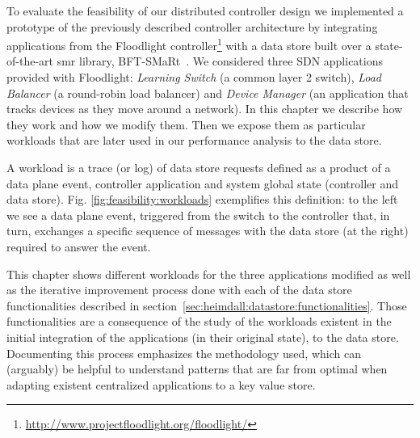 \label{sec:feasibility:apps}
\glsresetall


To evaluate the feasibility of our distributed controller design we implemented a prototype of the previously described controller architecture by integrating applications from the Floodlight controller\footnote{\url{http://www.projectfloodlight.org/floodlight/}} with a data store built over a state-of-the-art \gls{smr} library, BFT-SMaRt~\cite{smart-tr}.
We considered three SDN applications provided with Floodlight: \emph{Learning Switch}  (a common layer 2 switch), \emph{Load   Balancer} (a round-robin load balancer) and \emph{Device Manager} (an application that tracks devices as they move around a network).
In this chapter we describe how they work and how we modify them.  Then we expose them as particular workloads that are later used in our performance analysis to the data store. 



A workload is a trace (or log) of data store requests  defined as a product of a data plane event, controller application and system global state (controller and data store).
Fig. \ref{fig:feasibility:workloads} exemplifies this definition: to the left we see a data plane event, triggered from the switch to the controller that, in turn, exchanges a specific sequence of messages with the data store (at the right) required to answer the event.

This chapter shows different workloads for the three applications modified as well as the iterative improvement process done with each of the data store functionalities described in section~\ref{sec:heimdall:datastore:functionalities}. 
Those functionalities are a consequence of the study of the workloads existent in the initial integration of the applications (in their original state), to the data store.
Documenting this process emphasizes the methodology  used, which can (arguably) be helpful to understand patterns that are far from optimal when adapting existent centralized applications to a key value store. 

